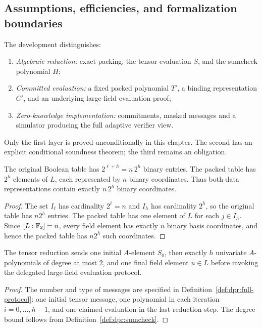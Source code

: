 \subsection{Assumptions, efficiencies, and formalization boundaries}\label{sec:dpr:interfaces}

\begin{definition}\label{def:dpr:layers}
The development distinguishes:
\begin{enumerate}[label=\textup{(\roman*)}]
\item \emph{Algebraic reduction:}
  exact packing, the tensor evaluation
  $S$, and the sumcheck polynomial $H$;
\item \emph{Committed evaluation:}
  a fixed packed polynomial $T'$,
  a binding representation $C'$, and
  an underlying large-field evaluation proof;
\item \emph{Zero-knowledge implementation:}
  commitments, masked messages and
  a simulator producing the full adaptive
  verifier view.
\end{enumerate}
Only the first layer is proved
unconditionally in this chapter.
The second has an explicit
conditional soundness theorem;
the third remains an obligation.
\end{definition}

\begin{lemma}\label{lem:dpr:table-size}
The original Boolean table has
$2^{\ell+h}=n\,2^h$ binary entries.
The packed table has $2^h$
elements of $L$, each represented
by $n$ binary coordinates.
Thus both data representations
contain exactly $n\,2^h$
binary coordinates.
\end{lemma}
\begin{proof}
The set $I_\ell$ has cardinality
$2^\ell=n$ and $I_h$ has
cardinality $2^h$, so the original
table has $n2^h$ entries.
The packed table has one element
of $L$ for each $j\in I_h$.
Since $[L:\mathbb{F}_2]=n$, every field
element has exactly $n$ binary
basis coordinates, and hence
the packed table has $n2^h$
such coordinates.
\end{proof}

\begin{lemma}\label{lem:dpr:round-count}
The tensor reduction sends one
initial $A$-element $S_0$,
then exactly $h$ univariate
$A$-polynomials of degree at most
$2$, and one final field
element $u\in L$ before
invoking the delegated
large-field evaluation protocol.
\end{lemma}
\begin{proof}
The number and type of messages
are specified in
Definition~\ref{def:dpr:full-protocol}:
one initial tensor message,
one polynomial in each iteration
$i=0,\ldots,h-1$, and one claimed
evaluation in the last reduction
step. The degree bound follows
from Definition~\ref{def:dpr:sumcheck}.
\end{proof}

